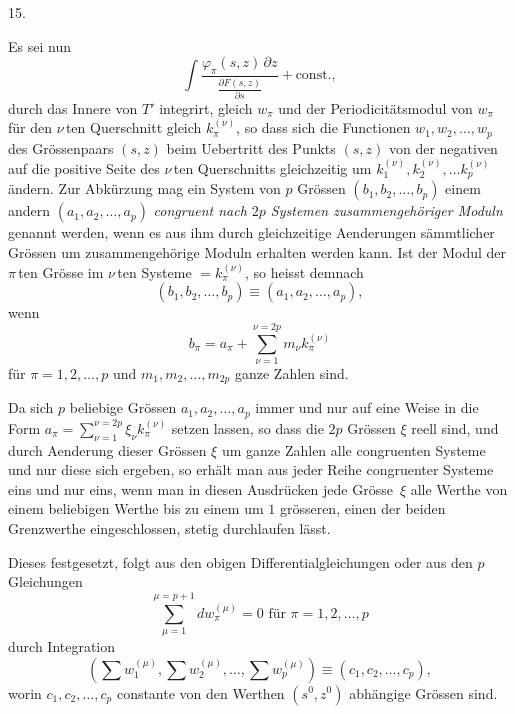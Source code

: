 \documentclass[a4paper,12pt,leqno]{article}
\begin{document}
\medbreak

\centerline{15.}

\nobreak\medskip

Es sei nun
\[ \int  \frac{\varphi_\pi(s, z) \, \partial z}{\displaystyle
            \frac{\partial F(s, z)}{\partial s}}
      + \mbox{const.},\]
durch das Innere von $T'$ integrirt, gleich $w_\pi$ und der
Periodicit\"{a}tsmodul von $w_\pi$ f\"{u}r den
$\nu \,$\-ten Querschnitt gleich $k_\pi^{(\nu)}$, so dass sich die
Functionen $w_1, w_2,\ldots, w_p$ des Gr\"{o}ssenpaars $(s,z)$
beim Uebertritt des Punkts $(s,z)$ von der negativen auf die
positive Seite des $\nu \,$\-ten Querschnitts gleichzeitig um
$k_1^{(\nu)}, k_2^{(\nu)},\ldots k_p^{(\nu)}$
\"{a}ndern.  Zur Abk\"{u}rzung mag ein System von $p$ Gr\"{o}ssen
$(b_1, b_2,\ldots, b_p)$ einem andern
$(a_1, a_2,\ldots, a_p)$ \emph{congruent nach $2p$ Systemen
zusammengeh\"{o}riger Moduln} genannt werden, wenn es aus ihm
durch gleichzeitige Aenderungen s\"{a}mmtlicher Gr\"{o}ssen um
zusammengeh\"{o}rige Moduln erhalten werden kann.  Ist der Modul
der $\pi \,$\-ten Gr\"{o}sse im $\nu \,$\-ten Systeme
$= k_\pi^{(\nu)}$, so heisst demnach
\[ (b_1, b_2,\ldots, b_p) \equiv (a_1, a_2,\ldots, a_p),\]
wenn
\[ b_\pi = a_\pi + \sum_{\nu = 1}^{\nu = 2p} m_\nu k_\pi^{(\nu)} \]
f\"{u}r $\pi = 1,2,\ldots, p$ und $m_1, m_2,\ldots, m_{2p}$ ganze
Zahlen sind.

Da sich $p$ beliebige Gr\"{o}ssen $a_1, a_2,\ldots, a_p$ immer
und nur auf eine Weise in die Form
$a_\pi = \sum\limits_{\nu = 1}^{\nu = 2p} \xi_\nu k_\pi^{(\nu)}$
setzen lassen, so dass die $2p$ Gr\"{o}ssen $\xi$ reell sind, und
durch Aenderung dieser Gr\"{o}ssen $\xi$ um ganze Zahlen alle
congruenten Systeme und nur diese sich ergeben, so erh\"{a}lt man
aus jeder Reihe congruenter Systeme eins und nur eins, wenn man
in diesen Ausdr\"{u}cken jede Gr\"{o}sse~$\xi$ alle Werthe von
einem beliebigen Werthe bis zu einem um $1$ gr\"{o}sseren, einen
der beiden Grenzwerthe eingeschlossen, stetig durchlaufen
l\"{a}sst.

Dieses festgesetzt, folgt aus den obigen Differentialgleichungen
oder aus den $p$ Gleichungen
\[ \sum_{\mu = 1}^{\mu = p + 1} dw_\pi^{(\mu)} = 0
   \mbox{ f\"{u}r } \pi = 1,2,\ldots, p \]
durch Integration
\[    \left(
         {\textstyle \sum} w_1^{(\mu)},
         {\textstyle \sum} w_2^{(\mu)},\ldots,
         {\textstyle \sum} w_p^{(\mu)}
      \right)
   \equiv (c_1, c_2,\ldots, c_p),\]
worin $c_1, c_2,\ldots, c_p$ constante von den Werthen
$(s^0, z^0)$ abh\"{a}ngige Gr\"{o}ssen sind.
\end{document}
